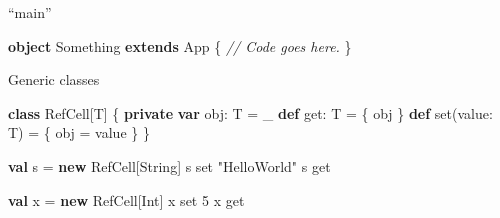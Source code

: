 \documentclass[ignorenonframetext,]{beamer}
\newenvironment{Shaded}{\begin{snugshade}}{\end{snugshade}}
\newcommand{\KeywordTok}[1]{\textcolor[rgb]{0.13,0.29,0.53}{\textbf{#1}}}
\newcommand{\DecValTok}[1]{\textcolor[rgb]{0.00,0.00,0.81}{#1}}
\newcommand{\StringTok}[1]{\textcolor[rgb]{0.31,0.60,0.02}{#1}}
\newcommand{\CommentTok}[1]{\textcolor[rgb]{0.56,0.35,0.01}{\textit{#1}}}
\newcommand{\FunctionTok}[1]{\textcolor[rgb]{0.00,0.00,0.00}{#1}}
\newcommand{\NormalTok}[1]{#1}
\begin{document}
\begin{frame}[fragile]
\begin{block}{``main''}
\begin{Shaded}
\begin{Highlighting}[]
\KeywordTok{object}\NormalTok{ Something }\KeywordTok{extends}\NormalTok{ App \{}
   \CommentTok{// Code goes here.}
\NormalTok{\}}
\end{Highlighting}
\end{Shaded}

\end{block}

\begin{block}{Generic classes}

\begin{Shaded}
\begin{Highlighting}[]
\KeywordTok{class}\NormalTok{ RefCell[T] \{}
    \KeywordTok{private} \KeywordTok{var}\NormalTok{ obj: T = _}
    \KeywordTok{def}\NormalTok{ get: T = \{ obj \}}
    \KeywordTok{def} \FunctionTok{set}\NormalTok{(value: T) = \{ obj = value \}}
\NormalTok{\}}

\KeywordTok{val}\NormalTok{ s = }\KeywordTok{new}\NormalTok{ RefCell[String]}
\NormalTok{s set }\StringTok{"HelloWorld"}
\NormalTok{s get}

\KeywordTok{val}\NormalTok{ x = }\KeywordTok{new}\NormalTok{ RefCell[Int]}
\NormalTok{x set }\DecValTok{5}
\NormalTok{x get}
\end{Highlighting}
\end{Shaded}

\end{block}

\end{frame}
\end{document}
